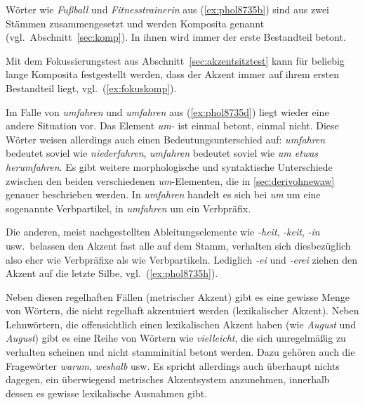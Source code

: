 Wörter wie \textit{Fußball} und \textit{Fitnesstrainerin} aus (\ref{ex:phol8735b}) sind aus zwei Stämmen zusammengesetzt und werden Komposita genannt (vgl.\ Abschnitt~\ref{sec:komp}).
In ihnen wird immer der erste Bestandteil betont.


Mit dem Fokussierungstest aus Abschnitt~\ref{sec:akzentsitztest} kann für beliebig lange Komposita festgestellt werden, dass der Akzent immer auf ihrem ersten Bestandteil liegt, vgl.\ (\ref{ex:fokuskomp}).

\begin{exe}
  \ex\label{ex:fokuskomp}
  \begin{xlist}
  \end{xlist}
\end{exe}

\newpage

Im Falle von \textit{\Akz umfahren} und \textit{um\Akz fahren} aus (\ref{ex:phol8735d}) liegt wieder eine andere Situation vor.
Das Element \textit{um-} ist einmal betont, einmal nicht.
Diese Wörter weisen allerdings auch einen Bedeutungsunterschied auf:
\textit{\Akz umfahren} bedeutet soviel wie \textit{niederfahren}, \textit{um\Akz fahren} bedeutet soviel wie \textit{um etwas herumfahren}.
Es gibt weitere morphologische und syntaktische Unterschiede zwischen den beiden verschiedenen \textit{um}-Elementen, die in \ref{sec:derivohnewaw} genauer beschrieben werden.
In \textit{\Akz umfahren} handelt es sich bei \textit{um} um eine sogenannte Verbpartikel, in \textit{um\Akz fahren} um ein Verbpräfix.


Die anderen, meist nachgestellten Ableitungselemente wie \textit{-heit}, \textit{-keit}, \textit{-in} usw.\ belassen den Akzent fast alle auf dem Stamm, verhalten sich diesbezüglich also eher wie Verbpräfixe als wie Verbpartikeln.
Lediglich \textit{-ei} und \textit{-erei} ziehen den Akzent auf die letzte Silbe, vgl.\ (\ref{ex:phol8735h}).

Neben diesen regelhaften Fällen (metrischer Akzent) gibt es eine gewisse Menge von Wörtern, die nicht regelhaft akzentuiert werden (lexikalischer Akzent).
Neben Lehnwörtern, die offensichtlich einen lexikalischen Akzent haben (wie \textit{\Akz August} und \textit{Au\Akz gust}) gibt es eine Reihe von Wörtern wie \textit{vie\Akz lleicht}, die sich unregelmäßig zu verhalten scheinen und nicht stamminitial betont werden.
Dazu gehören auch die Fragewörter \textit{wa\Akz rum}, \textit{wes\Akz halb} usw.
Es spricht allerdings auch überhaupt nichts dagegen, ein überwiegend metrisches Akzentsystem anzunehmen, innerhalb dessen es gewisse lexikalische Ausnahmen gibt.

